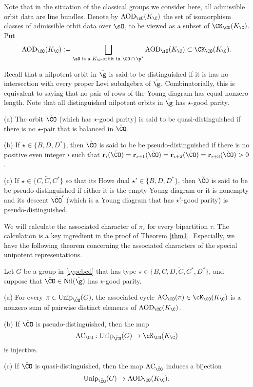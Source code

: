 \documentclass[ssunip.tex]{subfiles}
\begin{document}
Note that in the situation of the classical groups we consider here, all admissible
orbit data are line bundles.  Denote by $\mathrm{AOD}_{\sO}(K_\C)$ the
set of isomorphism classes of admissible orbit data over $\sO$, to be viewed as
a subset of $\CK_{\CO}(K_\C)$. Put
\[
  \mathrm{AOD}_{\CO}(K_\C):=\bigsqcup_{\sO\textrm{ is a $K_\C$-orbit in
      $\CO\cap \p^*$}} \mathrm{AOD}_{\sO}(K_\C)\subset
  \CK_{\CO}(K_\C).
\]


Recall that a nilpotent orbit in $\check \g$ is said to be distinguished if it is has no intersection with every  proper Levi subalgebra of $\check \g$. Combinatorially, this is equivalent to saying that no pair of rows of the Young diagram  has equal nonzero length. Note that all  distinguished nilpotent orbits in $\check \g$ has $\star$-good parity.

\begin{defn}
\noindent
(a) The orbit $\check \CO$ (which has $\star$-good parity) is said to be quasi-distinguished if there is no $\star$-pair that is balanced in $\check \CO$.

\noindent
(b) If  $\star\in \{B, D, D^*\}$, then $\check \CO$ is said to be  be pseudo-distinguished if there is no positive even integer $i$ such that $\mathbf{r}_i(\check \CO)=\mathbf{r}_{i+1}(\check \CO)= \mathbf{r}_{i+2}(\check \CO)=\mathbf{r}_{i+3}(\check \CO)>0$.


\noindent
(c) If  $\star\in \{C, \widetilde C, C^*\}$ so that its Howe dual $\star'\in  \{B, D, D^*\}$, then $\check \CO$ is said to be  be pseudo-distinguished if either it is the empty Young diagram or it is nonempty and its descent $\check \CO'$ (which is a Young diagram that has $\star'$-good parity) is   pseudo-distinguished.

\end{defn}





We will calculate the associated character of $\pi_\tau$ for every  bipartition $\tau$. The calculation is a key ingredient in the proof of Theorem \ref{thm1}.
Especially, we have the following theorem concerning the associated characters of the special unipotent representations.

\begin{thm}
Let $G$ be a group in \eqref{typebcd} that has type $\star\in \{B, C,D,\widetilde {C}, C^*, D^*\}$, and suppose that $\check \CO\in \mathrm{Nil}(\check \g)$  has $\star$-good parity.

\noindent (a) For every $\pi\in \mathrm{Unip}_{\check \CO}(G)$, the associated cycle $\mathrm{AC}_{\CO}(\pi)\in \cK_{\CO}(K_\C) $ is a nonzero  sum of  pairwise distinct elements of $\mathrm{AOD}_{\CO}(K_\C)$.

\noindent  (b) If $\check \CO$ is pseudo-distinguished, then the map
\[
\mathrm{AC}_\CO: \mathrm{Unip}_{\check \CO}(G)\rightarrow  \cK_{\CO}(K_\C)
\]
is injective.

\noindent  (c) If $\check \CO$ is quasi-distinguished, then the map $\mathrm{AC}_{\check \CO}$ induces a bijection
\[
\mathrm{Unip}_{\check \CO}(G)\rightarrow  \mathrm{AOD}_{\CO}(K_\C).
\]

\end{thm}
\end{document}
